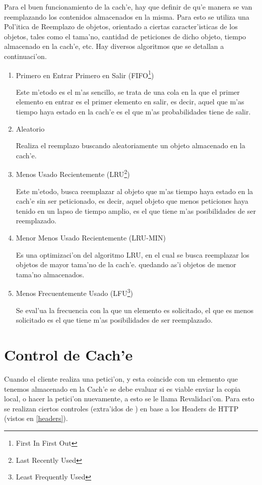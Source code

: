 Para el buen funcionamiento de la cach'e, hay que definir de qu'e manera se van reemplazando los contenidos almacenados en la misma. Para esto se utiliza una Pol'itica de Reemplazo de objetos, orientado a ciertas caracter'isticas de los objetos, tales como el tama'no, cantidad de peticiones de dicho objeto, tiempo almacenado en la cach'e, etc.
Hay diversos algoritmos que se detallan a continuaci'on.
\begin{enumerate}
\item Primero en Entrar Primero en Salir (FIFO\footnote{First In First Out})

Este m'etodo es el m'as sencillo, se trata de una cola en la que el primer elemento en entrar es el primer elemento en salir, es decir, aquel que m'as tiempo haya estado en la cach'e es el que m'as probabilidades tiene de salir.
\item Aleatorio

Realiza el reemplazo buscando aleatoriamente un objeto almacenado en la cach'e.
\item Menos Usado Recientemente (LRU\footnote{Last Recently Used})

Este m'etodo, busca reemplazar al objeto que m'as tiempo haya estado en la cach'e sin ser peticionado, es decir, aquel objeto que menos peticiones haya tenido en un lapso de tiempo amplio, es el que tiene m'as posibilidades de ser reemplazado.
\item Menor Menos Usado Recientemente (LRU-MIN)

Es una optimizaci'on del algoritmo LRU, en el cual se busca reemplazar los objetos de mayor tama'no de la cach'e. quedando as'i objetos de menor tama'no almacenados.
\item Menos Frecuentemente Usado (LFU\footnote{Least Frequently Used})

Se eval'ua la frecuencia con la que un elemento es solicitado, el que es menos solicitado es el que tiene m'as posibilidades de ser reemplazado.
\end{enumerate}

\section{Control de Cach'e}

Cuando el cliente realiza una petici'on, y esta coincide con un elemento que tenemos almacenado en la Cach'e se debe evaluar si es viable enviar la copia local, o hacer la petici'on nuevamente, a esto se le llama Revalidaci'on. Para esto se realizan ciertos controles (extra'idos de \citep{cacheDef}) en base a los Headers de HTTP (vistos en \ref{headers}).

